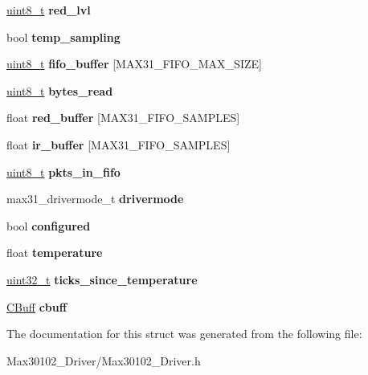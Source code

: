 \begin{DoxyCompactItemize}
\hyperlink{vl53l0x__types_8h_aba7bc1797add20fe3efdf37ced1182c5}{uint8\+\_\+t} {\bfseries red\+\_\+lvl}
\item 
\mbox{\label{structMax30102__Driver_af67fe57f1459e33c5ea3ee20143bf21a}} 
bool {\bfseries temp\+\_\+sampling}
\item 
\mbox{\label{structMax30102__Driver_aa2932ea4391a2345c27e5ac5b14ccbd6}} 
\hyperlink{vl53l0x__types_8h_aba7bc1797add20fe3efdf37ced1182c5}{uint8\+\_\+t} {\bfseries fifo\+\_\+buffer} \mbox{[}M\+A\+X31\+\_\+\+F\+I\+F\+O\+\_\+\+M\+A\+X\+\_\+\+S\+I\+ZE\mbox{]}
\item 
\mbox{\label{structMax30102__Driver_a504a6683ab569174046fe1c581aea4b9}} 
\hyperlink{vl53l0x__types_8h_aba7bc1797add20fe3efdf37ced1182c5}{uint8\+\_\+t} {\bfseries bytes\+\_\+read}
\item 
\mbox{\label{structMax30102__Driver_ad52aa33c8ad19cacde285e3f30ec690e}} 
float {\bfseries red\+\_\+buffer} \mbox{[}M\+A\+X31\+\_\+\+F\+I\+F\+O\+\_\+\+S\+A\+M\+P\+L\+ES\mbox{]}
\item 
\mbox{\label{structMax30102__Driver_ad3e81de48c6c2e2546f87a63088db43e}} 
float {\bfseries ir\+\_\+buffer} \mbox{[}M\+A\+X31\+\_\+\+F\+I\+F\+O\+\_\+\+S\+A\+M\+P\+L\+ES\mbox{]}
\item 
\mbox{\label{structMax30102__Driver_ac665c199687f1a405e4c73ff582a3782}} 
\hyperlink{vl53l0x__types_8h_aba7bc1797add20fe3efdf37ced1182c5}{uint8\+\_\+t} {\bfseries pkts\+\_\+in\+\_\+fifo}
\item 
\mbox{\label{structMax30102__Driver_aac42ca7ba8f056d2728e052fa0e662c8}} 
max31\+\_\+drivermode\+\_\+t {\bfseries drivermode}
\item 
\mbox{\label{structMax30102__Driver_a23c693c9e6fd29315f54f54b44e51d51}} 
bool {\bfseries configured}
\item 
\mbox{\label{structMax30102__Driver_adfdc2f3abf96d7620a3a0e96d4475678}} 
float {\bfseries temperature}
\item 
\mbox{\label{structMax30102__Driver_adee3ef5c399951219c44191cee97ebb7}} 
\hyperlink{vl53l0x__types_8h_a435d1572bf3f880d55459d9805097f62}{uint32\+\_\+t} {\bfseries ticks\+\_\+since\+\_\+temperature}
\item 
\mbox{\label{structMax30102__Driver_aed83761f4f5e3c83cea69b60ea139b67}} 
\hyperlink{structCBuffer__Handle}{C\+Buff} {\bfseries cbuff}
\end{DoxyCompactItemize}


The documentation for this struct was generated from the following file\+:\begin{DoxyCompactItemize}
\item 
Max30102\+\_\+\+Driver/Max30102\+\_\+\+Driver.\+h\end{DoxyCompactItemize}
